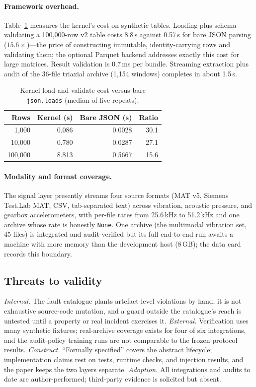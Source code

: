 \paragraph{Framework overhead.}
Table~\ref{tab:overhead} measures the kernel's cost on synthetic tables.
Loading plus schema-validating a 100{,}000-row v2 table costs 8.8\,s against
0.57\,s for bare JSON parsing ($15.6\times$)---the price of constructing
immutable, identity-carrying rows and validating them; the optional Parquet
backend addresses exactly this cost for large matrices. Result validation is
0.7\,ms per bundle. Streaming extraction plus audit of the 36-file triaxial
archive (1{,}154 windows) completes in about 1.5\,s.

\begin{table}[t]
\centering\small
\caption{Kernel load-and-validate cost versus bare \texttt{json.loads}
(median of five repeats).}
\label{tab:overhead}
\begin{tabular}{@{}rrrr@{}}
\toprule
Rows & Kernel (s) & Bare JSON (s) & Ratio \\
\midrule
1{,}000 & 0.086 & 0.0028 & 30.1 \\
10{,}000 & 0.780 & 0.0287 & 27.1 \\
100{,}000 & 8.813 & 0.5667 & 15.6 \\
\bottomrule
\end{tabular}
\end{table}

\paragraph{Modality and format coverage.}
The signal layer presently streams four source formats (MAT v5, Siemens
Test.Lab MAT, CSV, tab-separated text) across vibration, acoustic pressure,
and gearbox accelerometers, with per-file rates from 25.6\,kHz to 51.2\,kHz
and one archive whose rate is honestly \texttt{None}. One archive (the
multimodal vibration set, 45 files) is integrated and audit-verified but its
full end-to-end run awaits a machine with more memory than the development
host (8\,GB); the data card records this boundary.

\subsection{Threats to validity}

\emph{Internal.} The fault catalogue plants artefact-level violations by
hand; it is not exhaustive source-code mutation, and a guard outside the
catalogue's reach is untested until a property or real incident exercises
it. \emph{External.} Verification uses many synthetic fixtures; real-archive
coverage exists for four of six integrations, and the audit-policy training
runs are not comparable to the frozen protocol results. \emph{Construct.}
``Formally specified'' covers the abstract lifecycle; implementation claims
rest on tests, runtime checks, and injection results, and the paper keeps
the two layers separate. \emph{Adoption.} All integrations and audits to
date are author-performed; third-party evidence is solicited but absent.
